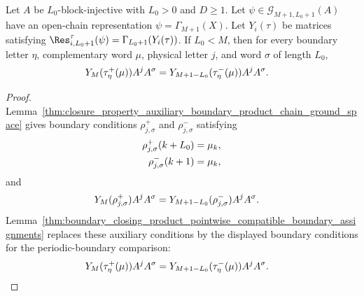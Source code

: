 \begin{lemma}
    \label{thm:boundary_closing_word_equation_chain_ground_space}
    \leanok
    Let $A$ be $L_0$-block-injective with $L_0>0$ and $D\ge1$. Let
    $\psi\in\mathcal G_{M+1,L_0+1}(A)$ have an open-chain representation
    $\psi=\Gamma_{M+1}(X)$. Let $Y_i(\tau)$ be matrices satisfying
    $\Res^{\tau}_{i,L_0+1}(\psi) = \Gamma_{L_0+1}(Y_i(\tau))$.
    If $L_0<M$, then for every boundary letter $\eta$, complementary word
    $\mu$, physical letter $j$, and word $\sigma$ of length $L_0$,
    \begin{align}
        Y_M(\tau^{+}_{\eta}(\mu))A^jA^\sigma
         & =
        Y_{M+1-L_0}(\tau^{-}_{\eta}(\mu))A^jA^\sigma.
        \notag
    \end{align}
\end{lemma}

\begin{proof}
    \leanok
    Lemma~\ref{thm:closure_property_auxiliary_boundary_product_chain_ground_space}
    gives boundary conditions $\rho^+_{j,\sigma}$ and
    $\rho^-_{j,\sigma}$ satisfying
    \begin{align}
        \rho^+_{j,\sigma}(k+L_0)
         & =
        \mu_k,
        \notag \\
        \rho^-_{j,\sigma}(k+1)
         & =
        \mu_k,
        \notag
    \end{align}
    and
    \begin{align}
        Y_M(\rho^+_{j,\sigma})A^jA^\sigma
         & =
        Y_{M+1-L_0}(\rho^-_{j,\sigma})A^jA^\sigma.
        \notag
    \end{align}
    Lemma~\ref{thm:boundary_closing_product_pointwise_compatible_boundary_assignments}
    replaces these auxiliary conditions by the displayed boundary conditions
    for the periodic-boundary comparison:
    \begin{align}
        Y_M(\tau^{+}_{\eta}(\mu))A^jA^\sigma
         & =
        Y_{M+1-L_0}(\tau^{-}_{\eta}(\mu))A^jA^\sigma.
        \notag
    \end{align}
\end{proof}

